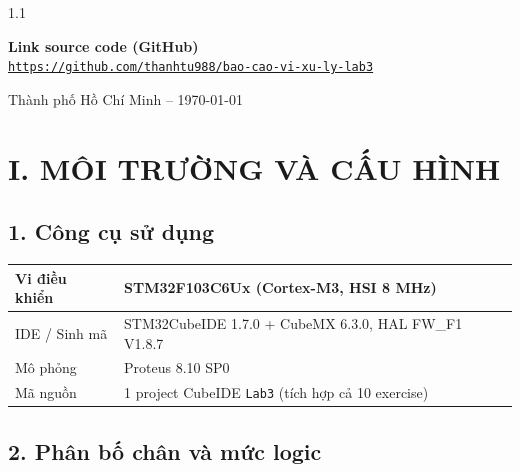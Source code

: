 \documentclass[a4paper,12pt]{article}
\newcommand{\githublink}{https://github.com/thanhtu988/bao-cao-vi-xu-ly-lab3}
\begin{document}
\begin{spacing}{1.1}
\begin{titlepage}
\begin{center}
    \begin{minipage}{0.85\textwidth}
    \begin{ghichu}
    \centering \textbf{Link source code (GitHub)} \\[0.3em]
    \texttt{\small \url{\githublink}}
    \end{ghichu}
    \end{minipage}

    \vfill
    Thành phố Hồ Chí Minh -- \today \\
\end{center}
\end{titlepage}


\section*{\centering I. MÔI TRƯỜNG VÀ CẤU HÌNH}

\subsection*{1. Công cụ sử dụng}

\begin{center}
\small
\begin{tabular}{|l|l|}
\hline
Vi điều khiển & STM32F103C6Ux (Cortex-M3, HSI 8 MHz) \\\hline
IDE / Sinh mã & STM32CubeIDE 1.7.0 + CubeMX 6.3.0, HAL FW\_F1 V1.8.7 \\\hline
Mô phỏng      & Proteus 8.10 SP0 \\\hline
Mã nguồn      & 1 project CubeIDE \texttt{Lab3} (tích hợp cả 10 exercise) \\\hline
\end{tabular}
\end{center}

\subsection*{2. Phân bố chân và mức logic}


\end{spacing}
\end{document}

